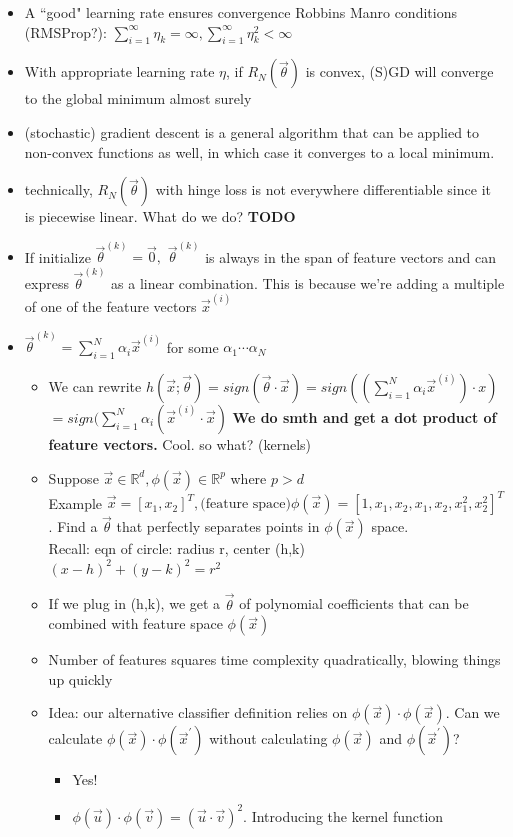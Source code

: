 \documentclass[10pt, oneside]{article}
\newcommand{\R}{\mathbb{R}}
\begin{document}
\begin{itemize}
    \item A ``good" learning rate ensures convergence Robbins Manro conditions (RMSProp?): $\sum_{i=1} ^\infty \eta_k =\infty, \sum_{i=1} ^\infty \eta_k ^2 < \infty$
    \item With appropriate learning rate $\eta$, if $R_N(\vec \theta)$ is convex, (S)GD will converge to the global minimum almost surely
    \item (stochastic) gradient descent is a general algorithm that can be applied to non-convex functions as well, in which case it converges to a local minimum.
    \item technically, $R_N(\vec \theta)$ with hinge loss is not everywhere differentiable since it is piecewise linear. What do we do? \textbf{TODO}    
    \item If initialize $\vec \theta ^{(k)} = \vec 0,$ $\vec \theta ^{(k)}$ is always in the span of feature vectors and can express $\vec \theta^{(k)}$ as a linear combination. This is because we're adding a multiple of one of the feature vectors $\vec x^{(i)}$
    \item $\vec \theta^{(k)} =\sum _{i=1} ^N \alpha_i \vec x^{(i)}$ for some $\alpha_1 \cdots \alpha_N$
    \begin{itemize}
        \item We can rewrite $h(\vec x;\vec \theta) = sign(\vec \theta \cdot \vec x)=sign((\sum_{i=1} ^N \alpha_i \vec x^{(i)}) \cdot x)$\\
        $=sign(\sum_{i=1}^N \alpha_i (\vec x^{(i)} \cdot \vec x)$ \textbf{We do smth and get a dot product of feature vectors. }Cool. so what? (kernels)
        \item Suppose $\vec x \in \R^d, \phi(\vec x)\in \R^p$ where $p > d$\\
        Example $\vec x=[x_1, x_2]^T, \text{(feature space)} \phi (\vec x) = [1,x_1, x_2, x_1, x_2, x_1^2, x_2 ^2]^T$. Find a $\vec \theta $ that perfectly separates points in $\phi(\vec x)$ space.\\
        Recall: eqn of circle: radius r, center (h,k)\\
        $(x-h)^2 + (y-k)^2 =r^2$
        \item If we plug in (h,k), we get a $\vec \theta$ of polynomial coefficients that can be combined with feature space $\phi(\vec x)$
        \item Number of features squares time complexity quadratically, blowing things up quickly
        \item Idea: our alternative classifier definition relies on $\phi(\vec x)\cdot \phi(\vec x)$. Can we calculate $\phi(\vec x) \cdot \phi(\vec x^\prime)$ without calculating $\phi(\vec x)$ and $\phi(\vec x^\prime)$?
        \begin{itemize}
            \item Yes!
            \item $\phi(\vec u) \cdot \phi (\vec v) = (\vec u \cdot \vec v)^2$. Introducing the kernel function
        \end{itemize}
    \end{itemize}
\end{itemize}
\end{document}
